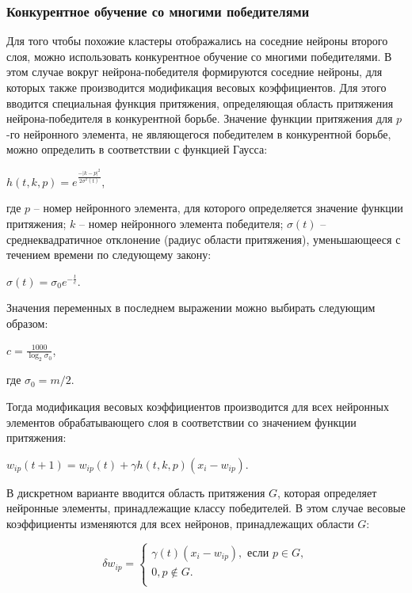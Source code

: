 \documentclass[bachelor, och, referat]{template}
\begin{document}
\subsubsection{Конкурентное обучение со многими победителями}

Для того чтобы похожие кластеры отображались на соседние нейроны 
второго слоя, можно использовать конкурентное обучение со многими 
победителями. В этом случае вокруг нейрона-победителя формируются 
соседние нейроны, для которых также производится модификация
весовых коэффициентов. Для этого вводится специальная функция притяжения, 
определяющая область притяжения нейрона-победителя в конкурентной борьбе. 
Значение функции притяжения для $p$-го нейронного
элемента, не являющегося победителем в конкурентной борьбе, можно
определить в соответствии с функцией Гаусса:

\begin{center}
    $h(t, k, p) = e^{\frac{-|k - p|^2}{2\sigma^2(t)}}$,
\end{center}

где $p$ -- номер нейронного элемента, для которого определяется 
значение функции притяжения; $k$ -- номер нейронного элемента 
победителя; $\sigma(t)$ -- среднеквадратичное отклонение (радиус 
области притяжения), уменьшающееся с течением времени по следующему закону:

\begin{center}
    $\sigma(t) = \sigma_0 e^{-\frac{t}{c}}$.
\end{center}

Значения переменных в последнем выражении можно выбирать следующим образом:

\begin{center}
    $c = \frac{1000}{\log_2{\sigma_0}}$,
\end{center}
где $\sigma_0 = m / 2$.

Тогда модификация весовых коэффициентов производится для всех
нейронных элементов обрабатывающего слоя в соответствии со 
значением функции притяжения:

\begin{center}
    $w_{ip}(t + 1) = w_{ip}(t) + \gamma h(t, k, p)(x_i - w_{ip})$.
\end{center}

В дискретном варианте вводится область притяжения $G$, которая
определяет нейронные элементы, принадлежащие классу победителей.
В этом случае весовые коэффициенты изменяются для всех нейронов,
принадлежащих области $G$:

\begin{equation*}
    \delta w_{ip} = 
    \begin{cases}
        \gamma(t)(x_i - w_{ip}), \text{ если } p \in G, \\
        0, p \notin G. \\
    \end{cases}
\end{equation*}
\end{document}
